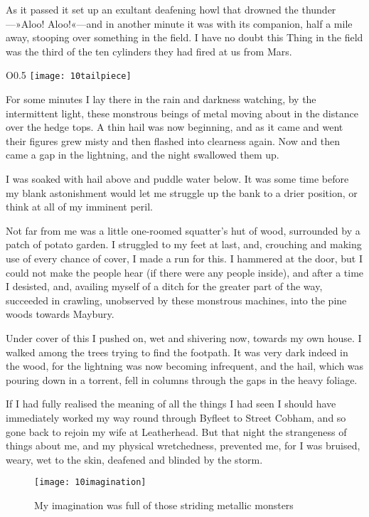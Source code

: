 As it passed it set up an exultant deafening howl that drowned the thunder—»Aloo! Aloo!«—and in another minute it was with its companion, half a mile away, stooping over something in the field. I have no doubt this Thing in the field was the third of the ten cylinders they had fired at us from Mars.

\begin{wrapfigure}{O}{0.5\textwidth}
\centering
\texttt{[image: 10tailpiece]}
\end{wrapfigure}

For some minutes I lay there in the rain and darkness watching, by the intermittent light, these monstrous beings of metal moving about in the distance over the hedge tops. A thin hail was now beginning, and as it came and went their figures grew misty and then flashed into clearness again. Now and then came a gap in the lightning, and the night swallowed them up.

I was soaked with hail above and puddle water below. It was some time before my blank astonishment would let me struggle up the bank to a drier position, or think at all of my imminent peril.

Not far from me was a little one-roomed squatter's hut of wood, surrounded by a patch of potato garden. I struggled to my feet at last, and, crouching and making use of every chance of cover, I made a run for this. I hammered at the door, but I could not make the people hear (if there were any people inside), and after a time I desisted, and, availing myself of a ditch for the greater part of the way, succeeded in crawling, unobserved by these monstrous machines, into the pine woods towards Maybury.

Under cover of this I pushed on, wet and shivering now, towards my own house. I walked among the trees trying to find the footpath. It was very dark indeed in the wood, for the lightning was now becoming infrequent, and the hail, which was pouring down in a torrent, fell in columns through the gaps in the heavy foliage.

If I had fully realised the meaning of all the things I had seen I should have immediately worked my way round through Byfleet to Street Cobham, and so gone back to rejoin my wife at Leatherhead. But that night the strangeness of things about me, and my physical wretchedness, prevented me, for I was bruised, weary, wet to the skin, deafened and blinded by the storm.

\begin{figure}[tbh]
\centering
\texttt{[image: 10imagination]}
\caption{My imagination was full of those striding metallic monsters}
\end{figure}


